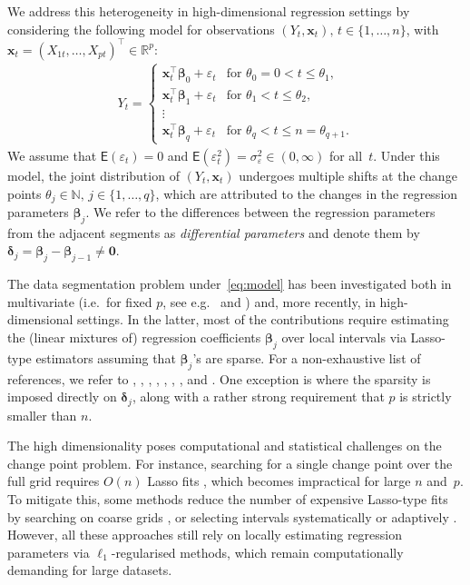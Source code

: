 \documentclass[11pt, a4paper]{article}
\newcommand{\mbf}{\mathbf}
\newcommand{\vep}{\varepsilon}
\renewcommand{\l}{\left}
\renewcommand{\r}{\right}
\newcommand{\cp}{\theta}
\newcommand{\E}[0]{\mathsf{E}}
\newcommand{\R}{\mathbb{R}}
\newcommand{\N}{\mathbb{N}}
\theoremstyle{definition}
\theoremstyle{definition}
\theoremstyle{definition}
\theoremstyle{definition}
\theoremstyle{definition}
\theoremstyle{remark}
\theoremstyle{definition}
\theoremstyle{definition}
\theoremstyle{definition}
\begin{document}
We address this heterogeneity in high-dimensional regression settings by considering the following model for  observations $(Y_t, \mbf x_t), \, t \in \{1, \ldots, n\}$, with $\mbf x_t = (X_{1t}, \ldots, X_{pt})^\top \in \R^p$:
\begin{align} 
\label{eq:model}
Y_t = \l\{\begin{array}{ll}
\mbf{x}_t^\top\bm{\beta}_0 + \vep_t & \text{for } \cp_0 = 0 < t \le \cp_1, \\
\mbf{x}_t^\top\bm{\beta}_1 + \vep_t & \text{for } \cp_1 < t \le \cp_2, \\
\vdots \\
\mbf{x}_t^\top\bm{\beta}_q + \vep_t & \text{for } \cp_q < t \le n = \cp_{q+1}.
\end{array} \r.	 
\end{align}
We assume that $\E(\vep_t) = 0$ and $\E(\vep_t^2) = \sigma_\vep^2 \in (0, \infty)$ for all~$t$. 
Under this model, the joint distribution of $(Y_t, \mbf x_t)$ undergoes multiple shifts at the change points $\cp_j \in \N, \, j \in \{1, \ldots, q\}$, which are attributed to the changes in the regression parameters $\bm{\beta}_j$. We refer to the differences between the regression parameters from the adjacent segments as {\it differential parameters} and denote them by $\bm\delta_j = \bm\beta_j - \bm\beta_{j - 1} \ne \mbf 0$.

The data segmentation problem under~\eqref{eq:model} has been investigated both in multivariate (i.e.\ for fixed $p$, see e.g.\ \citealp{csorgo1997limit} and \citealp{bai1998estimating}) and, more recently, in high-dimensional settings.
In the latter, most of the contributions require estimating the (linear mixtures of) regression coefficients $\bm\beta_j$ over local intervals via Lasso-type estimators assuming that $\bm\beta_j$'s are sparse. For a non-exhaustive list of references, we refer to \cite{lee2016lasso}, \cite{leonardi2016computationally}, \cite{kaul2019detection}, \cite{wang2021statistically}, \cite{rinaldo2020localizing}, \cite{bai2022unified}, \cite{cho2022high}, \cite{xu2022change} and \cite{liu2022change, liu2024simultaneous}. 
One exception is \cite{gao2022sparse} where the sparsity is imposed directly on $\bm\delta_j$, along with a rather strong requirement that $p$ is strictly smaller than $n$. 

The high dimensionality poses computational and statistical challenges on the change point problem.
For instance, searching for a single change point over the full grid requires $O(n)$ Lasso fits \citep{lee2016lasso, leonardi2016computationally}, which becomes impractical for large $n$ and~$p$. 
To mitigate this, some methods reduce the number of expensive Lasso-type fits by searching on coarse grids \citep{cho2022high, li2023divide}, or selecting intervals systematically \citep{qian2023reliever} or adaptively \citep{kovacs2020optimistic}.  However, all these approaches still rely on locally estimating regression parameters via $\ell_1$-regularised methods, which remain computationally demanding for large datasets.
\end{document}

